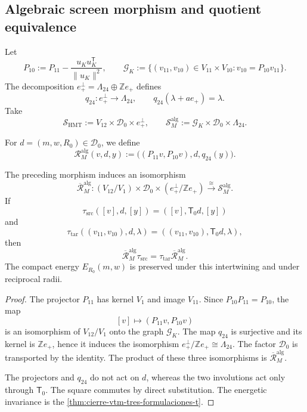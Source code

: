 \subsection{Algebraic screen morphism and quotient equivalence}

Let
\[
 P_{10}:=P_{11}-\frac{u_Ku_K^{\mathsf T}}{\lVert u_K\rVert^2},
 \qquad
 \mathscr G_K:=
 \{(v_{11},v_{10})\in V_{11}\times V_{10}:
             v_{10}=P_{10}v_{11}\}.
\]
The decomposition
\(e_+^\perp=\Lambda_{24}\oplus\mathbb Ze_+\) defines
\[
 q_{24}:e_+^\perp\longrightarrow\Lambda_{24},
 \qquad q_{24}(\lambda+ae_+)=\lambda.
\]
Take
\[
 \mathscr S_{\mathrm{HMT}}
 :=V_{12}\times\mathscr D_0\times e_+^\perp,
 \qquad
 \mathscr S_M^{\mathrm{alg}}
 :=\mathscr G_K\times\mathscr D_0\times\Lambda_{24}.
\]

\begin{definition}
\label{def:cierre-vtm-rm-algebraico}
For \(d=(m,w,R_0)\in\mathscr D_0\), we define
\[
 \boxed{
 \mathcal R_M^{\mathrm{alg}}(v,d,y)
 :=\bigl((P_{11}v,P_{10}v),d,q_{24}(y)\bigr).}
\]
\end{definition}

\begin{theorem}
\label{thm:cierre-vtm-rm-algebraico}
The preceding morphism induces an isomorphism
\[
 \boxed{
 \overline{\mathcal R}_M^{\mathrm{alg}}:
 (V_{12}/V_1)\times\mathscr D_0
 \times(e_+^\perp/\mathbb Ze_+)
 \xrightarrow{\ \cong\ }
 \mathscr S_M^{\mathrm{alg}}.}
\]
If
\[
 \tau_{\mathrm{src}}([v],d,[y])
 =([v],\mathsf T_0d,[y])
\]
and
\[
 \tau_{\mathrm{tar}}((v_{11},v_{10}),d,\lambda)
 =((v_{11},v_{10}),\mathsf T_0d,\lambda),
\]
then
\[
 \overline{\mathcal R}_M^{\mathrm{alg}}\tau_{\mathrm{src}}
 =\tau_{\mathrm{tar}}\overline{\mathcal R}_M^{\mathrm{alg}}.
\]
The compact energy \(E_{R_0}(m,w)\) is preserved under this
intertwining and under reciprocal radii.
\end{theorem}

\begin{proof}
The projector \(P_{11}\) has kernel \(V_1\) and image \(V_{11}\). Since
\(P_{10}P_{11}=P_{10}\), the map
\[
 [v]\longmapsto(P_{11}v,P_{10}v)
\]
is an isomorphism of \(V_{12}/V_1\) onto the graph
\(\mathscr G_K\). The map \(q_{24}\) is surjective and its kernel is
\(\mathbb Ze_+\), hence it induces the isomorphism
\(e_+^\perp/\mathbb Ze_+\cong\Lambda_{24}\). The factor
\(\mathscr D_0\) is transported by the identity. The product of these three
isomorphisms is \(\overline{\mathcal R}_M^{\mathrm{alg}}\).

The projectors and \(q_{24}\) do not act on \(d\), whereas the two
involutions act only through \(\mathsf T_0\). The square commutes
by direct substitution. The energetic invariance is the
\cref{thm:cierre-vtm-tres-formulaciones-t}.
\end{proof}


